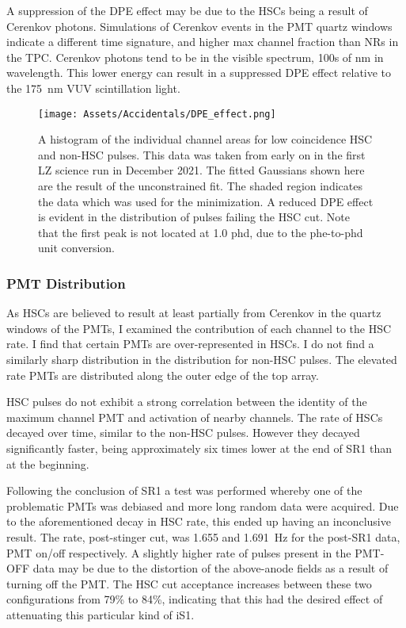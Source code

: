A suppression of the DPE effect may be due to the HSCs being a result of Cerenkov photons.
Simulations of Cerenkov events in the PMT quartz windows indicate a different time signature, and higher max channel fraction than NRs in the TPC.
Cerenkov photons tend to be in the visible spectrum, 100s of nm in wavelength.
This lower energy can result in a suppressed DPE effect relative to the 175~nm\cite{fujii_high-accuracy_2015} VUV scintillation light.

\begin{figure}
    \centering
    \texttt{[image: Assets/Accidentals/DPE\_effect.png]}
    \caption[A histogram of the individual channel areas for low coincidence HSC and non-HSC pulses.]%
    {A histogram of the individual channel areas for low coincidence HSC and non-HSC pulses.
    This data was taken from early on in the first LZ science run in December 2021.
    The fitted Gaussians shown here are the result of the unconstrained fit.
    The shaded region indicates the data which was used for the minimization.
    A reduced DPE effect is evident in the distribution of pulses failing the HSC cut.
    Note that the first peak is not located at 1.0 phd, due to the phe-to-phd unit conversion.}
    \label{fig:dpe_hsc}
\end{figure}

\subsubsection{PMT Distribution}
As HSCs are believed to result at least partially from Cerenkov in the quartz windows of the PMTs, I examined the contribution of each channel to the HSC rate.
I find that certain PMTs are over-represented in HSCs. 
I do not find a similarly sharp distribution in the distribution for non-HSC pulses.
The elevated rate PMTs are distributed along the outer edge of the top array.

HSC pulses do not exhibit a strong correlation between the identity of the maximum channel PMT and activation of nearby channels.
The rate of HSCs decayed over time, similar to the non-HSC pulses. 
However they decayed significantly faster, being approximately six times lower at the end of SR1 than at the beginning.

Following the conclusion of SR1 a test was performed whereby one of the problematic PMTs was debiased and more long random data were acquired.
Due to the aforementioned decay in HSC rate, this ended up having an inconclusive result.
The rate, post-stinger cut, was 1.655 and 1.691~Hz for the post-SR1 data, PMT on/off respectively.
A slightly higher rate of pulses present in the PMT-OFF data may be due to the distortion of the above-anode fields as a result of turning off the PMT.
The HSC cut acceptance increases between these two configurations from 79\% to 84\%, indicating that this had the desired effect of attenuating this particular kind of iS1.


